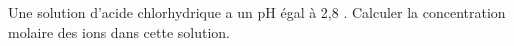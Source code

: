 Une solution d'acide chlorhydrique a un pH égal à 2,8 . Calculer la
concentration molaire des ions dans cette solution.

